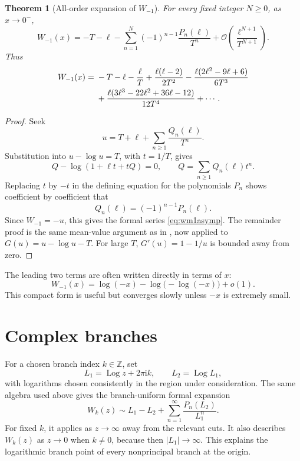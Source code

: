 \documentclass[11pt,openany]{book}
\newcommand{\ii}{\mathrm{i}}
\newcommand{\Wmone}{W_{-1}}
\newcommand{\bigO}{\mathcal{O}}
\newcommand{\littleo}{o}
\newcommand{\abs}[1]{\left|#1\right|}
\DeclareMathOperator{\Log}{Log}
\theoremstyle{plain}
\newtheorem{theorem}{Theorem}[chapter]
\theoremstyle{definition}
\theoremstyle{remark}
\begin{document}
\begin{theorem}[All-order expansion of \(W_{-1}\)]\label{thm:wm1asymp}
For every fixed integer \(N\ge0\), as \(x\to0^-\),
\begin{equation}\label{eq:wm1asymp}
 \Wmone(x)=-T-\ell-
 \sum_{n=1}^{N}(-1)^{n-1}\frac{P_n(\ell)}{T^n}
 +\bigO\left(\frac{\ell^{N+1}}{T^{N+1}}\right).
\end{equation}
Thus
\begin{align}
 W_{-1}(x)={}&-T-\ell-\frac{\ell}{T}
 +\frac{\ell(\ell-2)}{2T^2}
 -\frac{\ell(2\ell^2-9\ell+6)}{6T^3}\notag\\
 &+\frac{\ell(3\ell^3-22\ell^2+36\ell-12)}{12T^4}
 +\cdots.
\label{eq:wm1asympexplicit}
\end{align}
\end{theorem}

\begin{proof}
Seek
\[
 u=T+\ell+\sum_{n\ge1}\frac{Q_n(\ell)}{T^n}.
\]
Substitution into \(u-\log u=T\), with \(t=1/T\), gives
\[
 Q-\log(1+\ell t+tQ)=0,
 \qquad Q=\sum_{n\ge1}Q_n(\ell)t^n.
\]
Replacing \(t\) by \(-t\) in the defining equation for the polynomials
\(P_n\) shows coefficient by coefficient that
\[
       Q_n(\ell)=(-1)^{n-1}P_n(\ell).
\]
Since \(W_{-1}=-u\), this gives the formal series
\eqref{eq:wm1asymp}.  The remainder proof is the same mean-value argument as
in , now applied to
\(G(u)=u-\log u-T\).  For large \(T\),
\(G'(u)=1-1/u\) is bounded away from zero.
\end{proof}

The leading two terms are often written directly in terms of \(x\):
\begin{equation}\label{eq:wm1twologs}
 W_{-1}(x)=\log(-x)-\log\bigl(-\log(-x)\bigr)+\littleo(1).
\end{equation}
This compact form is useful but converges slowly unless \(-x\) is extremely
small.

\section{Complex branches}\label{sec:complexasymp}
For a chosen branch index \(k\in\mathbb Z\), set
\[
 L_1=\Log z+2\pi\ii k,
 \qquad L_2=\Log L_1,
\]
with logarithms chosen consistently in the region under consideration.  The
same algebra used above gives the branch-uniform formal expansion
\begin{equation}\label{eq:complexasymp}
 W_k(z)\sim L_1-L_2+
       \sum_{n=1}^{\infty}\frac{P_n(L_2)}{L_1^n}.
\end{equation}
For fixed \(k\), it applies as \(z\to\infty\) away from the relevant cuts.  It
also describes \(W_k(z)\) as \(z\to0\) when \(k\ne0\), because then
\(\abs{L_1}\to\infty\).  This explains the logarithmic branch point of every
nonprincipal branch at the origin.
\end{document}
